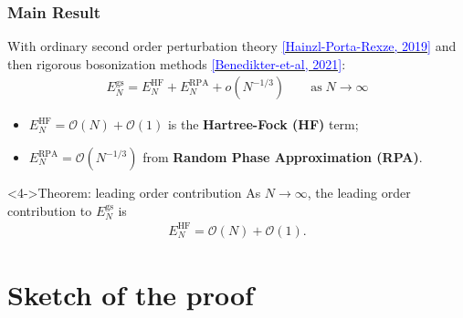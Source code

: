 \documentclass{beamer}
\begin{document}
\begin{frame}
	\frametitle{Main Result}
	\small
	With ordinary second order perturbation theory
	\href{https://link.springer.com/article/10.1007/s00220-019-03654-7}
		{\footnotesize\textcolor{blue}{[Hainzl-Porta-Rexze, 2019]}}
	and then rigorous bosonization methods
	\href{https://link.springer.com/article/10.1007/s00222-021-01041-5}
		{\footnotesize\textcolor{blue}{[Benedikter-et-al, 2021]}}:
	\begin{align*}
		E^{\mathrm{gs}}_N = E^{\mathrm{HF}}_N + E^{\mathrm{RPA}}_N
		+ o\left(N^{-1/3}\right)\qquad\text{as}\;N\to\infty
	\end{align*}
	\uncover<2->{where}
	\begin{itemize}
		\item<2-> $E^{\mathrm{HF}}_N=\mathcal{O}(N)+\mathcal{O}(1)$ is the
			\textbf{Hartree-Fock (HF)} term;
		\item<3-> $E^{\mathrm{RPA}}_N=\mathcal{O}(N^{-1/3})$ from
			\textbf{Random Phase Approximation (RPA)}.
	\end{itemize}
	\vspace{-0.4em}
	\begin{block}<4->{Theorem: leading order contribution}
		As $N\to\infty$, the leading order contribution to $E^{\mathrm{gs}}_N$ is
		\begin{align*}
			E^{\mathrm{HF}}_N = \mathcal{O}(N) + \mathcal{O}(1).
		\end{align*}
	\end{block}
	\vfill
\end{frame}

\section{Sketch of the proof}
\end{document}
